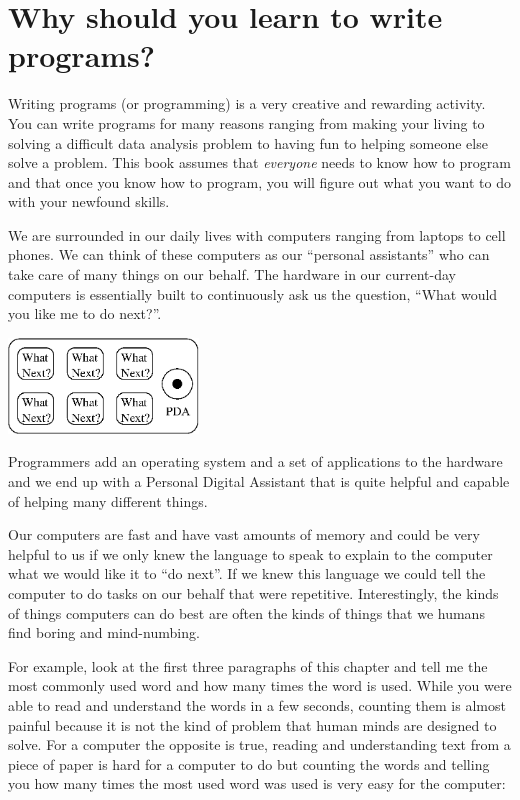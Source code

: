 
\chapter{Why should you learn to write programs?}

Writing programs (or programming) is a very creative 
and rewarding activity.  You can write programs for 
many reasons ranging from making your living to solving
a difficult data analysis problem to having fun to helping
someone else solve a problem.  This book assumes that 
\emph{everyone} needs to know how to program and that once 
you know how to program, you will figure out what you want 
to do with your newfound skills.  

We are surrounded in our daily lives with computers ranging 
from laptops to cell phones.  We can think of these computers
as our ``personal assistants'' who can take care of many things
on our behalf.  The hardware in our current-day computers 
is essentially built to continuously ask us the question, 
``What would you like me to do next?''.

\beforefig
\centerline{\includegraphics[height=1.00in]{figs2/pda.eps}}
\afterfig

Programmers add an operating system and a set of applications
to the hardware and we end up with a Personal Digital
Assistant that is quite helpful and capable of helping
many different things.

Our computers are fast and have vast amounts of memory and 
could be very helpful to us if we only knew the language to
speak to explain to the computer what we would like it to 
``do next''.  If we knew this language we could tell the 
computer to do tasks on our behalf that were repetitive.  
Interestingly, the kinds of things computers can do best
are often the kinds of things that we humans find boring
and mind-numbing.

For example, look at the first three paragraphs of this
chapter and tell me the most commonly used word and how
many times the word is used.  While you were able to read
and understand the words in a few seconds, counting them
is almost painful because it is not the kind of problem 
that human minds are designed to solve.  For a computer
the opposite is true, reading and understanding text 
from a piece of paper is hard for a computer to do 
but counting the words and telling you how many times
the most used word was used is very easy for the
computer:

